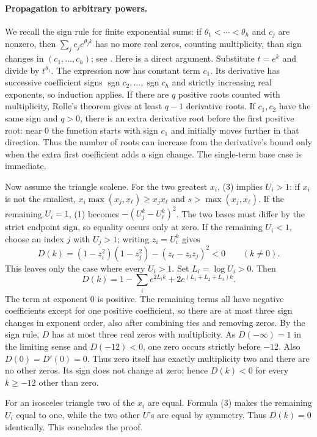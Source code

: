 \documentclass[11pt,a4paper]{article}
\numberwithin{equation}{section}
\theoremstyle{definition}
\theoremstyle{remark}
\begin{document}
\paragraph{Propagation to arbitrary powers.}
We recall the sign rule for finite exponential sums: if $\theta_1<\cdots<\theta_h$ and $c_j$ are nonzero, then $\sum_j c_j e^{\theta_j k}$ has no more real zeros, counting multiplicity, than sign changes in $(c_1,\ldots,c_h)$; see \cite{r39meiji:jameson}. Here is a direct argument. Substitute $t=e^k$ and divide by $t^{\theta_1}$. The expression now has constant term $c_1$. Its derivative has successive coefficient signs $\operatorname{sgn}c_2,\dots,\operatorname{sgn}c_h$ and strictly increasing real exponents, so induction applies. If there are $q$ positive roots counted with multiplicity, Rolle's theorem gives at least $q-1$ derivative roots. If $c_1,c_2$ have the same sign and $q>0$, there is an extra derivative root before the first positive root: near $0$ the function starts with sign $c_1$ and initially moves further in that direction. Thus the number of roots can increase from the derivative's bound only when the extra first coefficient adds a sign change. The single-term base case is immediate.

Now assume the triangle scalene. For the two greatest $x_i$, (3) implies $U_i>1$: if $x_i$ is not the smallest, $x_i\max(x_j,x_\ell)\ge x_jx_\ell$ and $s>\max(x_j,x_\ell)$. If the remaining $U_i=1$, (1) becomes $-(U_j^k-U_\ell^k)^2$. The two bases must differ by the strict endpoint sign, so equality occurs only at zero. If the remaining $U_i<1$, choose an index $j$ with $U_j>1$; writing $z_i=U_i^k$ gives
\[
 D(k)=(1-z_i^2)(1-z_j^2)-(z_\ell-z_iz_j)^2<0\qquad(k\ne0).
\]
This leaves only the case where every $U_i>1$. Set $L_i=\log U_i>0$. Then
\[
 D(k)=1-\sum_i e^{2L_i k}+2e^{(L_1+L_2+L_3)k}.
\]
The term at exponent $0$ is positive. The remaining terms all have negative coefficients except for one positive coefficient, so there are at most three sign changes in exponent order, also after combining ties and removing zeros. By the sign rule, $D$ has at most three real zeros with multiplicity. As $D(-\infty)=1$ in the limiting sense and $D(-12)<0$, one zero occurs strictly before $-12$. Also $D(0)=D'(0)=0$. Thus zero itself has exactly multiplicity two and there are no other zeros. Its sign does not change at zero; hence $D(k)<0$ for every $k\ge-12$ other than zero.

For an isosceles triangle two of the $x_i$ are equal. Formula (3) makes the remaining $U_i$ equal to one, while the two other $U$'s are equal by symmetry. Thus $D(k)=0$ identically. This concludes the proof.
\end{document}

